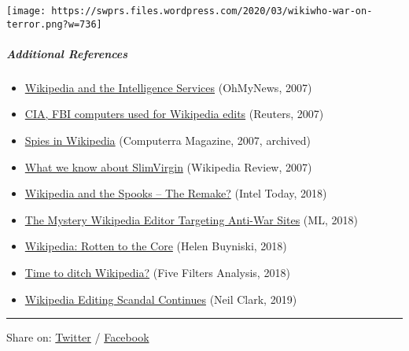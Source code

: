 \texttt{[image: https://swprs.files.wordpress.com/2020/03/wikiwho-war-on-terror.png?w=736]}

\hypertarget{additional-references}{%
\subparagraph{\texorpdfstring{\textbf{Additional
References}}{Additional References}}\label{additional-references}}

\begin{itemize}
\tightlist
\item
  \href{https://web.archive.org/web/20200528235242/http://english.ohmynews.com/articleview/article_view.asp?menu=c10400\&no=374006\&rel_no=1}{Wikipedia
  and the Intelligence Services} (OhMyNews, 2007)
\item
  \href{https://www.reuters.com/article/us-security-wikipedia/cia-fbi-computers-used-for-wikipedia-edits-idUSN1642896020070816}{CIA,
  FBI computers used for Wikipedia edits} (Reuters, 2007)
\item
  \href{https://archive.is/HtCeY}{Spies in Wikipedia} (Computerra
  Magazine, 2007, archived)
\item
  \href{http://wikipediareview.com/index.php?showtopic=11180}{What we
  know about SlimVirgin} (Wikipedia Review, 2007)
\item
  \href{https://gosint.wordpress.com/2018/06/02/wikipedia-the-spooks-the-remake-update-philip-cross-identified/}{Wikipedia
  and the Spooks -- The Remake?} (Intel Today, 2018)
\item
  \href{https://www.mintpressnews.com/phillip-cross-the-mystery-wikipedia-editor-targeting-anti-war-sites/250824/}{The
  Mystery Wikipedia Editor Targeting Anti-War Sites} (ML, 2018)
\item
  \href{https://web.archive.org/web/20191030100836/https://medium.com/@helen.buyniski/wikipedia-rotten-to-the-core-dcc435781c45}{Wikipedia:
  Rotten to the Core} (Helen Buyniski, 2018)
\item
  \href{https://wikipedia.fivefilters.org/}{Time to ditch Wikipedia?}
  (Five Filters Analysis, 2018)
\item
  \href{https://sputniknews.com/columnists/201910131077038943-andrew-philip-cross-wikipedia-editing-scandal-continues-but-for-how-much-longer/}{Wikipedia
  Editing Scandal Continues} (Neil Clark, 2019)
\end{itemize}

\begin{center}\rule{0.5\linewidth}{\linethickness}\end{center}

Share on:
\href{https://twitter.com/intent/tweet?url=https://swprs.org/wikipedia-disinformation-operation/}{Twitter}
/
\href{https://www.facebook.com/share.php?u=https://swprs.org/wikipedia-disinformation-operation/}{Facebook}

